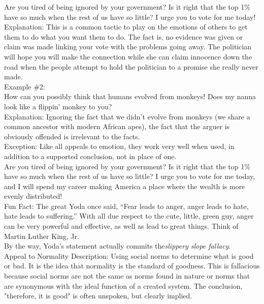 \documentclass[a4paper,12pt,single,pdftex]{scrbook}
\begin{document}
    
      Are you tired of being ignored by your government?  Is it right that the top 1\% have so much when the rest of us have so little?  I urge you to vote for me today!
    \\

    
      Explanation: This is a common tactic to play on the emotions of others to get them to do what you want them to do.  The fact is, no evidence was given or claim was made linking your vote with the problems going away.  The politician will hope you will make the connection while she can claim innocence down the road when the people attempt to hold the politician to a promise she really never made.
    \\

    
      Example \#2:
    \\

    
      How can you possibly think that humans evolved from monkeys!  Does my nanna look like a flippin' monkey to you?
    \\

    
      Explanation: Ignoring the fact that we didn’t evolve from monkeys (we share a common ancestor with modern African apes), the fact that the arguer is obviously offended is irrelevant to the facts.
    \\

    
      Exception: Like all appeals to emotion, they work very well when used, in addition to a supported conclusion, not in place of one.
    \\

    
      Are you tired of being ignored by your government?  Is it right that the top 1\% have so much when the rest of us have so little?  I urge you to vote for me today, and I will spend my career making America a place where the wealth is more evenly distributed!
    \\

    
      Fun Fact: The great Yoda once said, “Fear leads to anger, anger leads to hate, hate leads to suffering.” With all due respect to the cute, little, green guy, anger can be very powerful and effective, as well as lead to great things.  Think of Martin Luther King, Jr.
    \\

    
      By the way, Yoda’s statement actually commits the{\it  slippery slope  fallacy}.
    \\

  

Appeal to Normality
    Description: Using social norms to determine what is good or bad.  It is the idea that normality is the standard of goodness.  This is fallacious because social norms are not the same as norms found in nature or norms that are synonymous with the ideal function of a created system.  The conclusion, "therefore, it is good" is often unspoken, but clearly implied.
\end{document}
